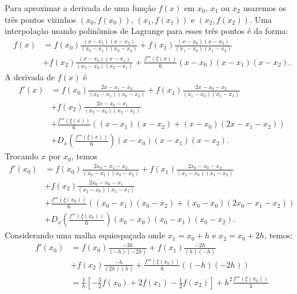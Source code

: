 Para aproximar a derivada de uma função $f(x)$ em $x_0$, $x_1$ ou $x_2$ usaremos os três pontos vizinhos $(x_0,f(x_0))$, $(x_{1},f(x_{1}))$ e $(x_{2},f(x_{2}))$. Uma interpolação usando polinômios de Lagrange para esses três pontos é da forma:
\begin{align*}
f(x)&=f(x_0)\frac{(x-x_{1})(x-x_{2})}{(x_0-x_{1})(x_0-x_{2})}
+f(x_{1})\frac{(x-x_{0})(x-x_{2})}{(x_{1}-x_{0})(x_{1}-x_{2})}\\
&+f(x_{2})\frac{(x-x_{0})(x-x_{1})}{(x_{2}-x_{0})(x_{2}-x_{1})} 
+\frac{f'''(\xi(x))}{6}(x-x_0)(x-x_{1})(x-x_{2}).
\end{align*}
A derivada de $f(x)$ é
\begin{equation}\label{tres_pontos}
  \begin{split}
    f'(x) &= f(x_0)\frac{2x-x_{1}-x_{2}}{(x_0-x_{1})(x_0-x_{2})}
    +f(x_{1})\frac{2x-x_{0}-x_{2}}{(x_{1}-x_{0})(x_{1}-x_{2})}\\
    &+f(x_{2})\frac{2x-x_{0}-x_{1}}{(x_{2}-x_{0})(x_{2}-x_{1})}\\
    &+\frac{f'''(\xi(x))}{6} \left( (x-x_{1})(x-x_{2}) +(x-x_0)(2x-x_{1}-x_{2})\right)\\
    &+ D_x\left(\frac{f'''(\xi(x))}{6}\right)(x-x_0)(x-x_1)(x-x_2).    
  \end{split}
\end{equation}
Trocando $x$ por $x_0$, temos
\begin{equation*}
  \begin{split}
    f'(x_0)&= f(x_0)\frac{2x_0-x_{1}-x_{2}}{(x_0-x_{1})(x_0-x_{2})}
    +f(x_{1})\frac{2x_0-x_{0}-x_{2}}{(x_{1}-x_{0})(x_{1}-x_{2})}\\
    &+f(x_{2})\frac{2x_0-x_{0}-x_{1}}{(x_{2}-x_{0})(x_{2}-x_{1})}\\
    &+ \frac{f'''(\xi(x_0))}{6} \left( (x_0-x_{1})(x_0-x_{2}) +(x_0-x_0)(2x_0-x_{1}-x_{2})\right)\\
    &+ D_x\left(\frac{f'''(\xi(x_0))}{6}\right)(x_0-x_0)(x_0-x_1)(x_0-x_2).
  \end{split}
\end{equation*}
Considerando uma malha equiespaçada onde $x_1=x_0+h$ e $x_2=x_0+2h$, temos:
\begin{equation*}
  \begin{split}
  f'(x_0)&= f(x_0)\frac{-3h}{(-h)(-2h)} + f(x_{1})\frac{-2h}{(h)(-h)} \\
  &+f(x_{2})\frac{-h}{(2h)(h)}+\frac{f'''(\xi(x_0))}{6} \left( (-h)(-2h)\right)\\
  &= \frac{1}{h}\left[-\frac{3}{2}f(x_0)+2f(x_{1})-\frac{1}{2}f(x_{2})\right]+h^2\frac{f'''(\xi(x_0))}{3}    
  \end{split}
\end{equation*}
